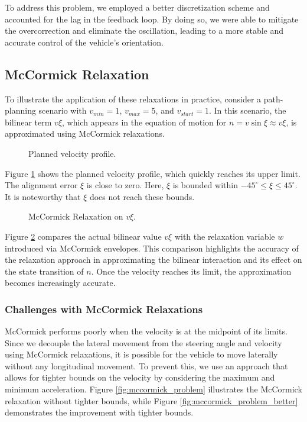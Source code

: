 To address this problem, we employed a better discretization scheme and accounted for the lag in the feedback loop.
By doing so, we were able to mitigate the overcorrection and eliminate the oscillation, leading to a more stable and accurate control of the
vehicle's orientation.

\subsection{McCormick Relaxation}

To illustrate the application of these relaxations in practice, consider a path-planning scenario with \( v_{min} = 1 \), \( v_{max} = 5 \), and \(
v_{start} = 1 \).
In this scenario, the bilinear term \( v\xi \), which appears in the equation of motion for \(\dot{n} = v \sin{\xi} \approx v\xi\), is approximated
using McCormick relaxations.

\begin{figure}[h]
	\centering
	\resizebox{1\textwidth}{!}{}
	\caption{Planned velocity profile.}
	\label{fig:velocity}
\end{figure}

Figure \ref{fig:velocity} shows the planned velocity profile, which quickly reaches its upper limit.
The alignment error $\xi$ is close to zero.
Here, \( \xi \) is bounded within \(-45^{\circ} \leq \xi \leq 45^{\circ} \).
It is noteworthy that \( \xi \) does not reach these bounds.

\begin{figure}[h]
	\centering
	\resizebox{0.6\textwidth}{!}{}
	\caption{McCormick Relaxation on $v\xi$.}
	\label{fig:dn-term-approx}
\end{figure}

Figure \ref{fig:dn-term-approx} compares the actual bilinear value \( v\xi \) with the relaxation variable \( w \) introduced via McCormick
envelopes.
This comparison highlights the accuracy of the relaxation approach in approximating the bilinear interaction and its effect on the state transition
of \( n \).
Once the velocity reaches its limit, the approximation becomes increasingly accurate.
\pagebreak
\subsubsection{Challenges with McCormick Relaxations}

McCormick performs poorly when the velocity is at the midpoint of its limits.
Since we decouple the lateral movement from the steering angle and velocity using McCormick relaxations, it is possible for the vehicle to move
laterally without any longitudinal movement.
To prevent this, we use an approach that allows for tighter bounds on the velocity by considering the maximum and minimum acceleration.
Figure \ref{fig:mccormick_problem} illustrates the McCormick relaxation without tighter bounds, while Figure \ref{fig:mccormick_problem_better}
demonstrates the improvement with tighter bounds.

